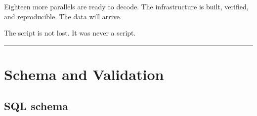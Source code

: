 Eighteen more parallels are ready to decode.
The infrastructure is built, verified, and reproducible.
The data will arrive.

The script is not lost. It was never a script.

\vspace{20pt}
\noindent\rule{0.4\linewidth}{0.4pt}

\vspace{6pt}

\clearpage
\appendix

\section{Schema and Validation}\label{sec:alloy}

\subsection{SQL schema}

